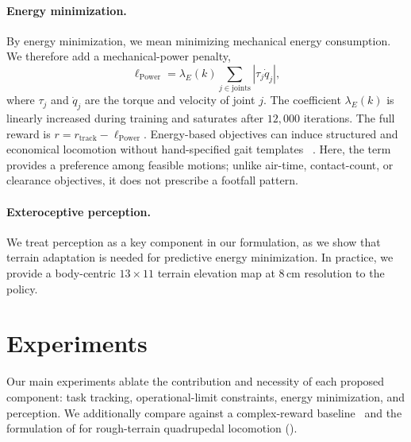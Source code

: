 \documentclass{article}
\begin{document}
    \paragraph{Energy minimization.}
    By energy minimization, we mean minimizing mechanical energy consumption. We therefore add a mechanical-power penalty,
    \begin{equation}
        \ell_{\mathrm{Power}}
        =
        \lambda_E(k)\sum_{j\in\mathrm{joints}} |\tau_j \dot q_j|,
    \end{equation}
    where \(\tau_j\) and \(\dot q_j\) are the torque and velocity of joint \(j\). The coefficient \(\lambda_E(k)\) is linearly increased during training and saturates after \(12{,}000\) iterations. The full reward is $r = r_{\mathrm{track}} - \ell_{\mathrm{Power}}$.
    Energy-based objectives can induce structured and economical locomotion without hand-specified gait templates ~\citep{fuMinimizingEnergyConsumption2022,schumacher2025emergancenatural,liangAdaptiveEnergyRegularization2025a}. Here, the term provides a preference among feasible motions; unlike air-time, contact-count, or clearance objectives, it does not prescribe a footfall pattern.
    
    \paragraph{Exteroceptive perception.} We treat perception as a key component in our formulation, as we show that terrain adaptation is needed for predictive energy minimization. In practice, we provide a body-centric \(13\times 11\) terrain elevation map at \(8\,\mathrm{cm}\) resolution to the policy.
    

    \section{Experiments}
    \label{sec:experiments}

    Our main experiments ablate the contribution and necessity of each proposed component: task tracking, operational-limit constraints, energy minimization, and perception. We additionally compare against a complex-reward baseline~\citep{rudinLearningWalkMinutes2022a} and the formulation of \citet{chane-saneCaTConstraintsTerminations2024a} for rough-terrain quadrupedal locomotion ().
\end{document}
